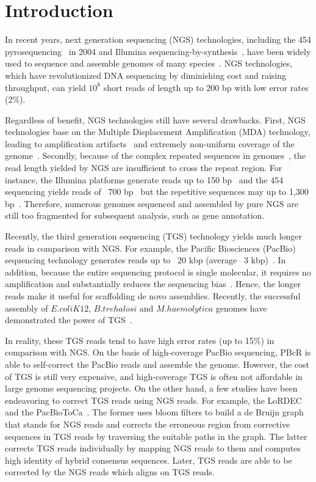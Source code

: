 \chapter{Introduction}


In recent years, next generation sequencing (NGS) technologies, including the 454 pyrosequencing~\cite{Marcel2005} in 2004 and Illumina sequencing-by-synthesis~\cite{Bentley2006}, have been widely used to sequence and assemble genomes of many species~\cite{NGS2010, genome10k2009}. NGS technologies, which have revolutionized DNA sequencing by diminishing cost and raising throughput, can yield $10^{8}$ short reads of length up to 200 bp with low error rates (2\%). 

Regardless of benefit, NGS technologies still have several drawbacks. First, NGS technologies base on the Multiple Displacement Amplification (MDA) technology, leading to amplification artifacts~\cite{pmid24852006} and extremely non-uniform coverage of the genome~\cite{pmid21685062}. Secondly, because of the complex repeated sequences in genomes~\cite{pmid18341692}, the read length yielded by NGS are insufficient to cross the repeat region. For instance, the Illumina platforms generate reads up to 150 bp~\cite{pmid23644548} and the 454 sequencing yields reads of ~700 bp~\cite{pmid23644548} but the repetitive sequences may up to 1,300 bp~\cite{pmid25132181}. Therefore, numerous genomes sequenced and assembled by pure NGS are still too fragmented for subsequent analysis, such as gene annotation. 


Recently, the third generation sequencing (TGS) technology yields much longer reads in comparison with NGS. For example, the Pacific Biosciences (PacBio) sequencing technology generates reads up to ~20 kbp (average ~3 kbp)~\cite{pmid25705213}. In addition, because the entire sequencing protocol is single molecular, it requires no amplification and substantially reduces the sequencing bias~\cite{pmid20858600}. Hence, the longer reads make it useful for scaffolding de novo assemblies. Recently, the successful assembly of $E. coli K12$, $B. trehalosi$ and $M. haemolytica$ genomes have demonstrated the power of TGS~\cite{Koren2013}.

In reality, these TGS reads tend to have high error rates (up to 15\%) in comparison with NGS. On the basis of high-coverage PacBio sequencing, PBcR is able to self-correct the PacBio reads and assemble the genome. However, the cost of TGS is still very expensive, and high-coverage TGS is often not affordable in large genome sequencing projects. On the other hand, a few studies have been endeavoring to correct TGS reads using NGS reads. For example, the LoRDEC~\cite{Salmela2014} and the PacBioToCa~\cite{Koren2012}. The former uses bloom filters to build a de Bruijn graph that stands for NGS reads and corrects the erroneous region from corrective sequences in TGS reads by traversing the suitable paths in the graph. The latter corrects TGS reads individually by mapping NGS reads to them and computes high identity of hybrid consensus sequences. Later, TGS reads are able to be corrected by the NGS reads which aligns on TGS reads.


